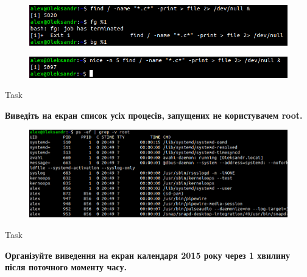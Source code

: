 \documentclass[a4paper,12pt]{article}
\newcommand{\RomanNumeralCaps}[1]{\MakeUppercase{\romannumeral #1}}
\begin{document}
\newpage
    \begin{figure}[h!]
        \begin{minipage}[h]{1\linewidth}
            \centering
            \includegraphics[width=0.6\linewidth]{Prt sc/Figure_6_2.png}  
        \end{minipage}
    \end{figure}
    \begin{figure}[h!]
        \begin{minipage}[h]{1\linewidth}
            \centering
            \includegraphics[width=0.6\linewidth]{Prt sc/Figure_6_3.png}  
        \end{minipage}
    \end{figure}
    \begin{center}
        \Large{Task \RomanNumeralCaps{7}}
    \end{center}
    \textbf{Виведіть на екран список усіх процесів, запущених не користувачем root.}
    \begin{figure}[h!]
        \begin{minipage}[h]{1\linewidth}
            \centering
            \includegraphics[width=0.6\linewidth]{Prt sc/Figure_7.png}  
        \end{minipage}
    \end{figure}
    \begin{center}
        \Large{Task \RomanNumeralCaps{8}}
    \end{center}
    \textbf{Організуйте виведення на екран календаря \textbf{2015} року через 1 хвилину після поточного моменту часу.}
\end{document}

